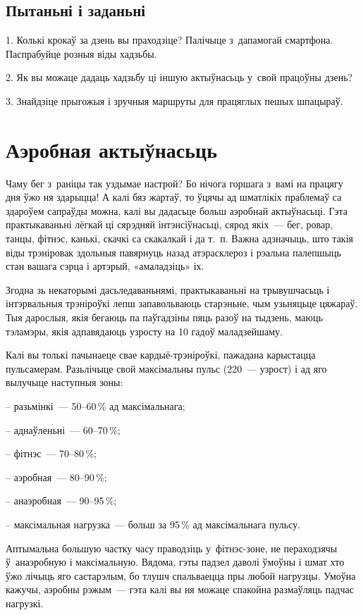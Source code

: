 \subsection*{Пытаньні і заданьні}

1. Колькі крокаў за дзень вы праходзіце? Палічыце з~дапамогай смартфона. Паспрабуйце розныя віды хадзьбы.

2. Як вы можаце дадаць хадзьбу ці іншую актыўнасьць у~свой працоўны дзень?

3. Знайдзіце прыгожыя і зручныя маршруты для працяглых пешых шпацыраў.


\section{Аэробная актыўнасьць}

Чаму бег з~раніцы так уздымае настрой? Бо нічога горшага з~вамі на працягу дня ўжо ня здарыцца! А калі бяз жартаў, то ўцячы ад шматлікіх праблемаў са здароўем сапраўды можна, калі вы дадасьце больш аэробнай актыўнасьці. Гэта практыкаваньні лёгкай ці сярэдняй інтэнсіўнасьці, сярод якіх~--- бег, ровар, танцы, фітнэс, канькі, скачкі са скакалкай і да т.~п. Важна адзначыць, што такія віды трэніровак здольныя павярнуць назад атэрасклероз і рэальна палепшыць стан вашага сэрца і артэрый, «амаладзіць» іх.

Згодна зь некаторымі дасьледаваньнямі, практыкаваньні на трывушчасьць і інтэрвальныя трэніроўкі лепш запавольваюць старэньне, чым узьняцьце цяжараў. Тыя дарослыя, якія бегаюць па паўгадзіны пяць разоў на тыдзень, маюць тэламэры, якія адпавядаюць узросту на 10 гадоў маладзейшаму.

Калі вы толькі пачынаеце свае кардыё-трэніроўкі, пажадана карыстацца пульсамерам. Разьлічыце свой максімальны пульс (220~--- узрост) і ад яго вылучыце наступныя зоны:

– разьмінкі~--- 50--60\,\% ад максімальнага;

– аднаўленьні~--- 60--70\,\%;

– фітнэс~--- 70--80\,\%;

– аэробная~--- 80--90\,\%;

– анаэробная~--- 90--95\,\%;

– максімальная нагрузка~--- больш за 95\,\% ад максімальнага пульсу.

Аптымальна большую частку часу праводзіць у~фітнэс-зоне, не пераходзячы ў~анаэробную і максімальную. Вядома, гэты падзел даволі ўмоўны і шмат хто ўжо лічыць яго састарэлым, бо тлушч спальваецца пры любой нагрузцы. Умоўна кажучы, аэробны рэжым~--- гэта калі вы ня можаце спакойна размаўляць падчас нагрузкі.

